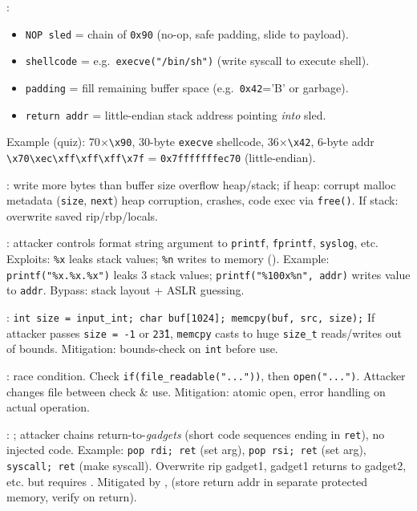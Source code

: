 :
\begin{itemize}
\setlength{\itemsep}{0pt}
\item \texttt{NOP sled} = chain of \texttt{0x90} (no-op, safe padding, slide to payload).
\item \texttt{shellcode} = e.g.\ \texttt{execve("/bin/sh")} (write syscall to execute shell).
\item \texttt{padding} = fill remaining buffer space (e.g.\ \texttt{0x42}='B' or garbage).
\item \texttt{return addr} = little-endian stack address pointing \textit{into} sled.
\end{itemize}
Example (quiz): 70$\times$\texttt{\textbackslash x90}, 30-byte \texttt{execve} shellcode, 36$\times$\texttt{\textbackslash x42}, 6-byte addr \texttt{\textbackslash x70\textbackslash xec\textbackslash xff\textbackslash xff\textbackslash xff\textbackslash x7f} = \texttt{0x7fffffffec70} (little-endian).

: write more bytes than buffer size \to overflow heap/stack; if heap: corrupt malloc metadata (\texttt{size}, \texttt{next}) \to heap corruption, crashes, code exec via \texttt{free()}. If stack: overwrite saved rip/rbp/locals.

: attacker controls format string argument to \texttt{printf}, \texttt{fprintf}, \texttt{syslog}, etc. Exploits: \texttt{\%x} leaks stack values; \texttt{\%n} writes to memory (). Example: \texttt{printf("\%x.\%x.\%x")} leaks 3 stack values; \texttt{printf("\%100x\%n", addr)} writes value to \texttt{addr}. Bypass: stack layout + ASLR guessing.

: \texttt{int size = input\_int; char buf[1024]; memcpy(buf, src, size);} If attacker passes \texttt{size = -1} or \texttt{2\^31}, \texttt{memcpy} casts to huge \texttt{size\_t} \to reads/writes out of bounds. Mitigation: bounds-check on \texttt{int} before use.

:  race condition. Check \texttt{if(file\_readable("..."))}, then \texttt{open("...")}. Attacker changes file between check \& use. Mitigation: atomic open, error handling on actual operation.

: ; attacker chains return-to-\textit{gadgets} (short code sequences ending in \texttt{ret}), no injected code. Example: \texttt{pop rdi; ret} (set arg), \texttt{pop rsi; ret} (set arg), \texttt{syscall; ret} (make syscall). Overwrite rip \to gadget1, gadget1 returns to gadget2, etc.  but requires . Mitigated by ,  (store return addr in separate protected memory, verify on return).

